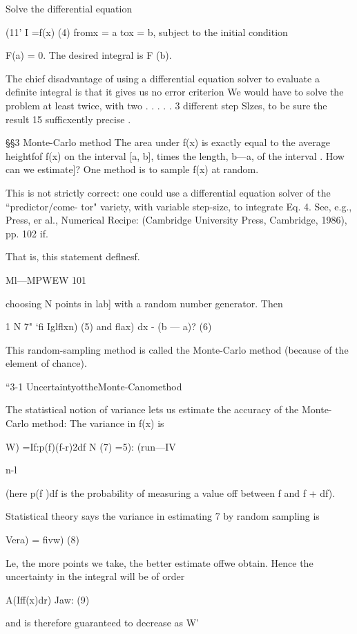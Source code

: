 Solve the differential equation

(11’
I =f(x) (4)
fromx = a tox = b, subject to the initial condition

 

F(a) = 0.
The desired integral is F (b).

The chief disadvantage of using a differential equation solver to
evaluate a deﬁnite integral is that it gives us no error criterion
We would have to solve the problem at least twice, with two
. . . . . 3
different step Slzes, to be sure the result 15 sufficxently precise .

§§3 Monte-Carlo method
The area under f(x) is exactly equal to the average heightfof
f(x) on the interval [a, b], times the length, b—a, of the interval .
How can we estimate]? One method is to sample f(x) at random.

 

This is not strictly correct: one could use a differential equation solver of the “predictor/come-
tor" variety, with variable step-size, to integrate Eq. 4. See, e.g., Press, er al., Numerical Recipe:
(Cambridge University Press, Cambridge, 1986), pp. 102 if.

That is, this statement deﬂnesf.

Ml—MPWEW 101

choosing N points in lab] with a random number generator.
Then

1 N
7" ‘ﬁ Iglﬂxn) (5)
and
ﬂax) dx - (b — a)? (6)

This random-sampling method is called the Monte-Carlo method
(because of the element of chance).

“3-1 UncertaintyottheMonte-Canomethod

The statistical notion of variance lets us estimate the accuracy of
the Monte-Carlo method: The variance in f(x) is

W) =If:p(f)(f-r)2df
N (7)
=5): (run—IV

n-l

(here p(f )df is the probability of measuring a value off between
f and f + df).

Statistical theory says the variance in estimating 7 by random
sampling is

Vera) = ﬁvw) (8)

Le, the more points we take, the better estimate offwe obtain.
Hence the uncertainty in the integral will be of order

A(Iff(x)dr) Jaw: (9)

and is therefore guaranteed to decrease as W'

